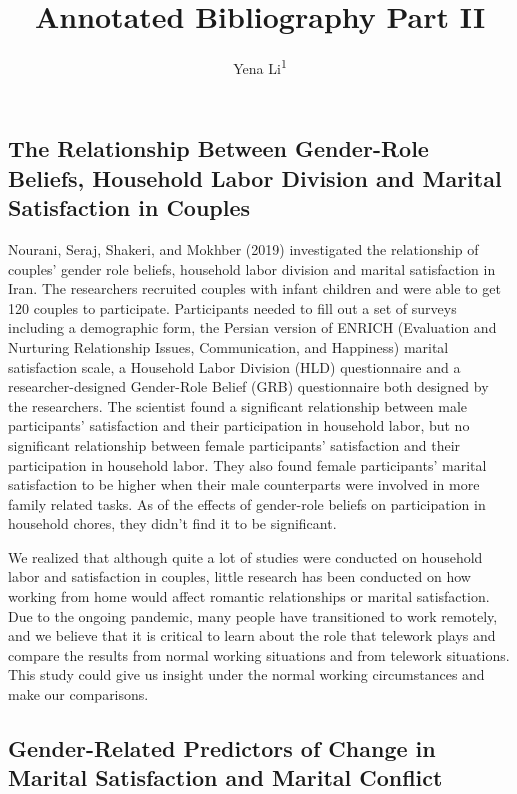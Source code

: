 \documentclass[
  english,
  man]{apa6}
\title{Annotated Bibliography Part II}
\author{Yena Li\textsuperscript{1}}
\date{}
\affiliation{\vspace{0.5cm}\textsuperscript{1} Smith College}
\begin{document}
\maketitle

\hypertarget{the-relationship-between-gender-role-beliefs-household-labor-division-and-marital-satisfaction-in-couples}{%
\subsection{The Relationship Between Gender-Role Beliefs, Household Labor Division and Marital Satisfaction in Couples}\label{the-relationship-between-gender-role-beliefs-household-labor-division-and-marital-satisfaction-in-couples}}

Nourani, Seraj, Shakeri, and Mokhber (2019) investigated the relationship of couples' gender role beliefs, household labor division and marital satisfaction in Iran. The researchers recruited couples with infant children and were able to get 120 couples to participate. Participants needed to fill out a set of surveys including a demographic form, the Persian version of ENRICH (Evaluation and Nurturing Relationship Issues, Communication, and Happiness) marital satisfaction scale, a Household Labor Division (HLD) questionnaire and a researcher-designed Gender-Role Belief (GRB) questionnaire both designed by the researchers. The scientist found a significant relationship between male participants' satisfaction and their participation in household labor, but no significant relationship between female participants' satisfaction and their participation in household labor. They also found female participants' marital satisfaction to be higher when their male counterparts were involved in more family related tasks. As of the effects of gender-role beliefs on participation in household chores, they didn't find it to be significant.

We realized that although quite a lot of studies were conducted on household labor and satisfaction in couples, little research has been conducted on how working from home would affect romantic relationships or marital satisfaction. Due to the ongoing pandemic, many people have transitioned to work remotely, and we believe that it is critical to learn about the role that telework plays and compare the results from normal working situations and from telework situations. This study could give us insight under the normal working circumstances and make our comparisons.

\hypertarget{gender-related-predictors-of-change-in-marital-satisfaction-and-marital-conflict}{%
\subsection{Gender-Related Predictors of Change in Marital Satisfaction and Marital Conflict}\label{gender-related-predictors-of-change-in-marital-satisfaction-and-marital-conflict}}
\end{document}
